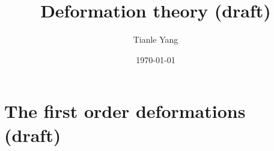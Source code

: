 \documentclass[sectionlevel=chapter]{noteformyself}
\title{Deformation theory (draft)}
\author{Tianle Yang}
\date{\today}
\begin{document}
    \maketitle

    \tableofcontents

    \section{The first order deformations (draft)}
    

    \printbibliography[heading=bibintoc, title={References}]
    
\end{document}
